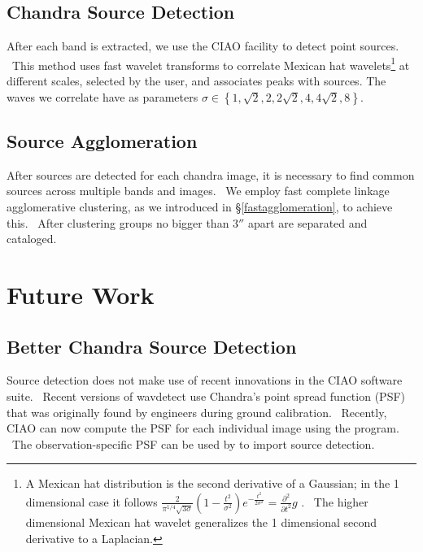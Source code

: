 \documentclass{amsart}
\newcommand{\tmtexttt}[1]{{\ttfamily{#1}}}
\begin{document}
\subsection{Chandra Source Detection}

After each band is extracted, we use the CIAO facility \tmtexttt{wavdetect} to
detect point sources. \ This method uses fast wavelet transforms to correlate
Mexican hat wavelets{\footnote{A Mexican hat distribution is the second
derivative of a Gaussian; in the 1 dimensional case it follows
$\frac{2}{\pi^{1 / 4}  \sqrt{3 \sigma}} \left( 1 - \frac{t^2}{\sigma^2}
\right) e^{- \frac{t^2}{2 \sigma^2}} = \frac{\partial^2}{\partial t^2} g$ . \
The higher dimensional Mexican hat wavelet generalizes the 1 dimensional
second derivative to a Laplacian.}} at different scales, selected by the user,
and associates peaks with sources. The waves we correlate have as parameters
$\sigma \in \left\{ 1, \sqrt{2}, 2, 2 \sqrt{2}, 4, 4 \sqrt{2}, 8 \right\}$.

\subsection{Source Agglomeration}\label{source_agg}

After sources are detected for each chandra image, it is necessary to find
common sources across multiple bands and images. \ We employ fast complete
linkage agglomerative clustering, as we introduced in
{\S}\ref{fastagglomeration}, to achieve this. \ After clustering groups no
bigger than $3''$ apart are separated and cataloged.

\section{Future Work}\label{future}

\subsection{Better Chandra Source Detection}

Source detection does not make use of recent innovations in the CIAO software
suite. \ Recent versions of wavdetect use Chandra's point spread function
(PSF) that was originally found by engineers during ground calibration. \
Recently, CIAO can now compute the PSF for each individual image using the
\tmtexttt{mkpsfmap} program. \ The observation-specific PSF can be used by
\tmtexttt{wavdetect} to import source detection.
\end{document}
